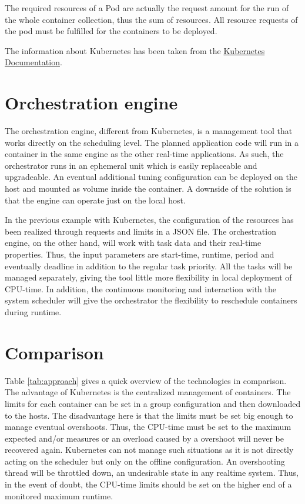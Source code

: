 \documentclass[]{scrartcl}
\begin{document}
The required resources of a Pod are actually the request amount for the run of the whole container collection, thus the sum of resources. All resource requests of the pod must be fulfilled for the containers to be deployed.

The information about Kubernetes has been taken from the
\href{https://kubernetes.io/docs/concepts/configuration/manage-compute-resources-container/}{Kubernetes Documentation}.


\section{Orchestration engine}

The orchestration engine, different from Kubernetes, is a management tool that works directly on the scheduling level. The planned application code will run in a container in the same engine as the other real-time applications. 
As such, the orchestrator runs in an ephemeral unit which is easily replaceable and upgradeable. An eventual additional tuning configuration can be deployed on the host and mounted as volume inside the container. 
A downside of the solution is that the engine can operate just on the local host.

In the previous example with Kubernetes, the configuration of the resources has been realized through requests and limits in a JSON file. 
The orchestration engine, on the other hand, will work with task data and their real-time properties. 
Thus, the input parameters are start-time, runtime, period and eventually deadline in addition to the regular task priority.
All the tasks will be managed separately, giving the tool little more flexibility in local deployment of CPU-time.
In addition, the continuous monitoring and interaction with the system scheduler will give the orchestrator the flexibility to reschedule containers during runtime.

\section{Comparison}

Table \ref{tab:approach} gives a quick overview of the technologies in comparison.
The advantage of Kubernetes is the centralized management of containers. 
The limits for each container can be set in a group configuration and then downloaded to the hosts. 
The disadvantage here is that the limits must be set big enough to manage eventual overshoots. 
Thus, the CPU-time must be set to the maximum expected and/or measures or an overload caused by a overshoot will never be recovered again.
Kubernetes can not manage such situations as it is not directly acting on the scheduler but only on the offline configuration. 
An overshooting thread will be throttled down, an undesirable state in any realtime system.
Thus, in the event of doubt, the CPU-time limits should be set on the higher end of a monitored maximum runtime.
\end{document}
